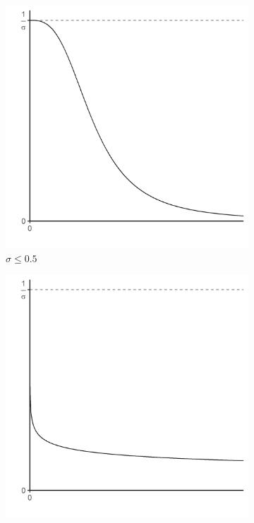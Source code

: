 	\begin{figure}[tb]
		\begin{subfigure}[t]{0.32\linewidth}
			\centering
			\includegraphics[width=1\linewidth]{../result/appendix_A/function_h/graph_1.png} 
			\caption{$\sigma \leq 0.5$} 
			\label{fig:h_shape_1} 
		\end{subfigure}
		\begin{subfigure}[t]{0.32\linewidth}
			\centering
			\includegraphics[width=1\linewidth]{../result/appendix_A/function_h/graph_2.png} 

\end{subfigure}
\end{figure}
